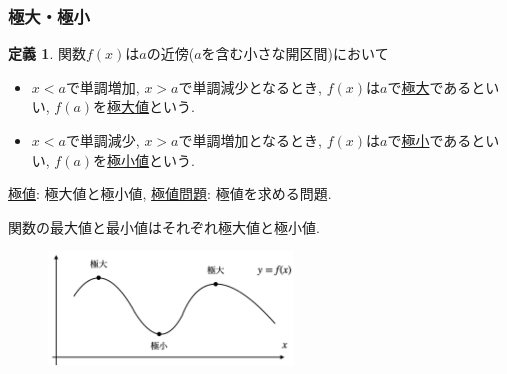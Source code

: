 \documentclass[dvipdfmx,cjk,10.2pt]{beamer}
\theoremstyle{definition}
\newtheorem{Def}[Thm]{定義}
\begin{document}



\begin{frame}
\frametitle{極大・極小}
\vspace{-2.5mm}

\begin{Def}
関数$f(x)$は$a$の近傍($a$を含む小さな開区間)において
\begin{itemize} 
\item $x<a$で単調増加,  $x>a$で単調減少となるとき, $f(x)$は$a$で\underline{極大}であるといい, $f(a)$を\underline{極大値}という.
\item  $x<a$で単調減少,  $x>a$で単調増加となるとき, $f(x)$は$a$で\underline{極小}であるといい, $f(a)$を\underline{極小値}という.
\end{itemize}
\underline{極値}: 極大値と極小値, \underline{極値問題}: 極値を求める問題. 
\end{Def}

関数の最大値と最小値はそれぞれ極大値と極小値. 

\vspace{-1mm}

 \begin{figure}[htbp]
 \begin{center} 
  \includegraphics[width=65mm]{local_maxmin.png}
 \end{center}
\end{figure}

\end{frame}


\end{document}
